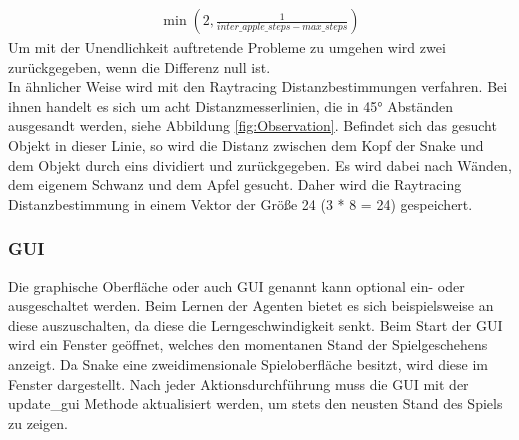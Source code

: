 \begin{align}
	\min(2, \frac{1}{inter\_apple\_steps - max\_steps})
\end{align}
Um mit der Unendlichkeit auftretende Probleme zu umgehen wird zwei zurückgegeben, wenn die Differenz null ist.\\
In ähnlicher Weise wird mit den Raytracing Distanzbestimmungen verfahren. Bei ihnen handelt es sich um acht Distanzmesserlinien, die in 45° Abständen ausgesandt werden, siehe Abbildung \ref{fig:Observation}. Befindet sich das gesucht Objekt in dieser Linie, so wird die Distanz zwischen dem Kopf der Snake und dem Objekt durch eins dividiert und zurückgegeben. Es wird dabei nach Wänden, dem eigenem Schwanz und dem Apfel gesucht. Daher wird die Raytracing Distanzbestimmung in einem Vektor der Größe 24 (3 * 8 = 24) gespeichert.

\subsubsection{GUI}
Die graphische Oberfläche oder auch GUI genannt kann optional ein- oder ausgeschaltet werden. Beim Lernen der Agenten bietet es sich beispielsweise an diese auszuschalten, da diese die Lerngeschwindigkeit senkt. Beim Start der GUI wird ein Fenster geöffnet, welches den momentanen Stand der Spielgeschehens anzeigt. Da Snake eine zweidimensionale Spieloberfläche besitzt, wird diese im Fenster dargestellt. Nach jeder Aktionsdurchführung muss die GUI mit der update\_gui Methode aktualisiert werden, um stets den neusten Stand des Spiels zu zeigen.

